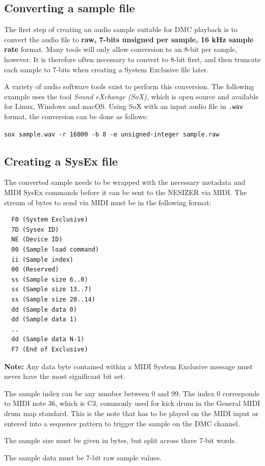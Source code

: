 \documentclass[a4paper, 12p]{extarticle}
\begin{document}
\subsection{Converting a sample file}
The first step of creating an audio sample suitable for DMC playback is to convert the audio file to \textbf{raw, 7-bits unsigned per sample, 16 kHz sample rate} format. Many tools will only allow conversion to an 8-bit per sample, however. It is therefore often necessary to convert to 8-bit first, and then truncate each sample to 7-bits when creating a System Exclusive file later.

A variety of audio software tools exist to perform this conversion. The following example uses the tool \emph{Sound eXchange (SoX)}, which is open source and available for Linux, Windows and macOS. Using SoX with an input audio file in \verb+.wav+ format, the conversion can be done as follows:

\verb+sox sample.wav -r 16000 -b 8 -e unsigned-integer sample.raw+

\subsection{Creating a SysEx file}
The converted sample needs to be wrapped with the necessary metadata and MIDI SysEx commands before it can be sent to the NESIZER via MIDI. The stream of bytes to send via MIDI must be in the following format:

\begin{verbatim}
  F0 (System Exclusive)
  7D (Sysex ID)
  NE (Device ID)
  00 (Sample load command)
  ii (Sample index)
  00 (Reserved)
  ss (Sample size 6..0)
  ss (Sample size 13..7)
  ss (Sample size 20..14)
  dd (Sample data 0)
  dd (Sample data 1)
  ..
  dd (Sample data N-1)
  F7 (End of Exclusive)
\end{verbatim}

\textbf{Note:} Any data byte contained within a MIDI System Exclusive message must never have the most significant bit set.

The sample index can be any number between 0 and 99. The index 0 corresponds to MIDI note 36, which is C3, commonly used for kick drum in the General MIDI drum map standard. This is the note that has to be played on the MIDI input or entered into a sequence pattern to trigger the sample on the DMC channel.

The sample size must be given in bytes, but split across three 7-bit words.

The sample data must be 7-bit raw sample values.
\end{document}
